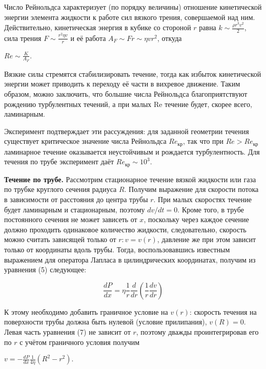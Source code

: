 \documentclass{article}
\begin{document}
Число Рейнольдса характеризует (по порядку величины) отношение кинетической энергии элемента жидкости к работе сил вязкого трения, совершаемой над ним. Действительно, кинетическая энергия в кубике со стороной $r$ равна
$ k \sim \frac{\rho r^3 v^2}{2}$, сила трения $F \sim \frac{r^2 \eta v}{r}$ и её работа $ A_F \sim F r \sim \eta v r^2 $, откуда

\begin{center}
    $Re \sim \frac{K}{A_F}$.
\end{center}

Вязкие силы стремятся стабилизировать течение, тогда как избыток кинетической энергии может приводить к переходу её части в вихревое движение. Таким образом, можно заключить, что большие числа Рейнольдса благоприятствуют рождению турбулентных течений, а при малых Re течение будет, скорее всего, ламинарным.

Эксперимент подтверждает эти рассуждения: для заданной геометрии течения существует критическое значение числа Рейнольдса $Re_{кр}$, так что при $Re > Re_{кр}$ ламинарное течение оказывается неустойчивым и рождается турбулентность. Для течения по трубе эксперимент даёт $Re_{кр}\sim 10^3.$

\textbf{Течение по трубе.} Рассмотрим стационарное течение вязкой жидкости или газа по трубке круглого сечения радиуса $R$. Получим выражение для скорости потока в зависимости от расстояния до центра трубы $r$. При малых скоростях течение будет ламинарным и стационарным, поэтому $ dv/dt = 0$. Кроме того, в трубе постоянного сечения не может зависеть от $x$, поскольку через каждое сечение должно проходить одинаковое количество жидкости, следовательно, скорость можно считать зависящей только от $r: v = v(r)$, давление же при этом зависит только от координаты вдоль трубы. Тогда, воспользовавшись известным выражением для оператора Лапласа в цилиндрических координатах, получим из уравнения (5) следующее:

\begin{equation}
        \frac{dP}{dx} = \eta \frac{1}{r} \frac{d}{d r} (\frac{1}{r} \frac{dv}{dr})
\end{equation}

К этому необходимо добавить граничное условие на $v(r)$: скорость течения на поверхности трубы должна быть нулевой (условие прилипания), $v(R) = 0$. Левая часть уравнения (7) не зависит от $r$, поэтому дважды проинтегрировав его по $r$ с учётом граничного условия получим

\begin{center}
    $ v = - \frac{dP}{dx} \frac{1}{4 \eta} (R^2 - r^2). $
\end{center}
\end{document}
